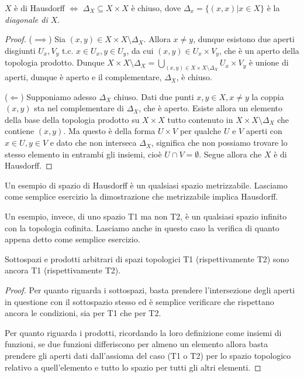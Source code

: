 \begin{prop}
  $X$ è di Hausdorff $\Leftrightarrow$ $\Delta_X \subseteq X \times X$ è chiuso, dove $\Delta_x=\{ (x, x) | x \in X \}$ è la \textit{diagonale di $X$}.
\end{prop}

\begin{proof}
  ($\implies$) Sia $(x, y) \in X \times X \setminus \Delta_X$. Allora $x \not= y$, dunque esistono due aperti disgiunti $U_x, V_y$ t.c. $x \in U_x, y \in U_y$, da cui $(x, y) \in U_x \times V_y$, che è un aperto della topologia prodotto. Dunque $\displaystyle X \times X \setminus \Delta_X=\bigcup_{(x, y) \in X \times X \setminus \Delta_X} U_x \times V_y$ è unione di aperti, dunque è aperto e il complementare, $\Delta_X$, è chiuso.

  ($\Leftarrow$) Supponiamo adesso $\Delta_X$ chiuso. Dati due punti $x, y \in X, x \not= y$ la coppia $(x, y)$ sta nel complementare di $\Delta_X$, che è aperto. Esiste allora un elemento della base della topologia prodotto su $X \times X$ tutto contenuto in $X \times X \setminus \Delta_X$ che contiene $(x, y)$. Ma questo è della forma $U \times V$ per qualche $U$ e $V$ aperti con $x \in U, y \in V$ e dato che non interseca $\Delta_X$, significa che non possiamo trovare lo stesso elemento in entrambi gli insiemi, cioè $U \cap V= \emptyset$. Segue allora che $X$ è di Hausdorff.
\end{proof}

\begin{ex} \label{metrizz->T2}
  Un esempio di spazio di Hausdorff è un qualsiasi spazio metrizzabile. Lasciamo come semplice esercizio la dimostrazione che metrizzabile implica Hausdorff.

  Un esempio, invece, di uno spazio T1 ma non T2, è un qualsiasi spazio infinito con la topologia cofinita. Lasciamo anche in questo caso la verifica di quanto appena detto come semplice esercizio.
\end{ex}

\begin{prop}
  Sottospazi e prodotti arbitrari di spazi topologici T1 (rispettivamente T2) sono ancora T1 (rispettivamente T2).
\end{prop}

\begin{proof}
  Per quanto riguarda i sottospazi, basta prendere l'intersezione degli aperti in questione con il sottospazio stesso ed è semplice verificare che rispettano ancora le condizioni, sia per T1 che per T2.

  Per quanto riguarda i prodotti, ricordando la loro definizione come insiemi di funzioni, se due funzioni differiscono per almeno un elemento allora basta prendere gli aperti dati dall'assioma del caso (T1 o T2) per lo spazio topologico relativo a quell'elemento e tutto lo spazio per tutti gli altri elementi.
\end{proof}

